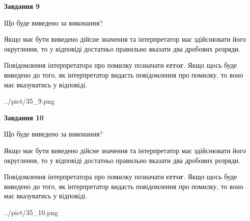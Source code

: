 \documentclass[12pt, ukrainian]{article}
\begin{document}
{\begin {Large}
{\begin {center}\textbf{Завдання 9}\end {center}}\par
Що буде виведено за виконання? \par

Якщо має бути виведено дійсне значення та інтерпретатор має здійснювати його округлення, 
то у відповіді достатньо правильно вказати два дробових розряди.

Повідомлення інтерпретатора про помилку позначати \textbf{error}.
Якщо щось буде виведено до того, як інтерпретатор видасть повідомлення про помилку, 
то воно має вказуватись у відповіді. \par

\begin{center}
	{../pict/35_9.png}
\end{center}
\newpage

{\begin {center}\textbf{Завдання 10}\end {center}}\par
Що буде виведено за виконання? \par

Якщо має бути виведено дійсне значення та інтерпретатор має здійснювати його округлення, 
то у відповіді достатньо правильно вказати два дробових розряди.

Повідомлення інтерпретатора про помилку позначати \textbf{error}.
Якщо щось буде виведено до того, як інтерпретатор видасть повідомлення про помилку, 
то воно має вказуватись у відповіді. \par

\begin{center}
	{../pict/35_10.png}
\end{center}
\newpage

\end {Large}}
\end{document}
